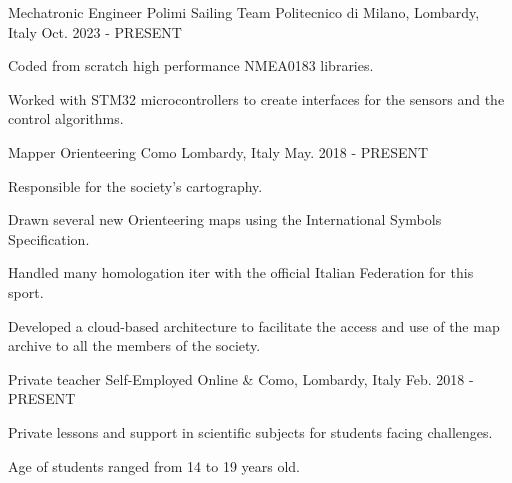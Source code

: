 

\begin{cventries}

  \cventry
  {Mechatronic Engineer} %
  {Polimi Sailing Team} %
  {Politecnico di Milano, Lombardy, Italy} %
  {Oct. 2023 - PRESENT} %
  {
    \begin{cvitems} %
      \item {Coded from scratch high performance NMEA0183 libraries.}
      \item {Worked with STM32 microcontrollers to create interfaces for the sensors and the control algorithms.}
    \end{cvitems}
  }

  \cventry
  {Mapper} %
  {Orienteering Como} %
  {Lombardy, Italy} %
  {May. 2018 - PRESENT} %
  {
    \begin{cvitems} %
      \item {Responsible for the society's cartography.}
      \item {Drawn several new Orienteering maps using the International Symbols Specification.}
      \item {Handled many homologation iter with the official Italian Federation for this sport.}
      \item {Developed a cloud-based architecture to facilitate the access and use of the map archive to all the members of the society.}
    \end{cvitems}
  }

  \cventry
  {Private teacher} %
  {Self-Employed} %
  {Online \& Como, Lombardy, Italy} %
  {Feb. 2018 - PRESENT} %
  {
    \begin{cvitems} %
      \item {Private lessons and support in scientific subjects for students facing challenges.}
      \item {Age of students ranged from 14 to 19 years old.}
    \end{cvitems}
  }


\end{cventries}
